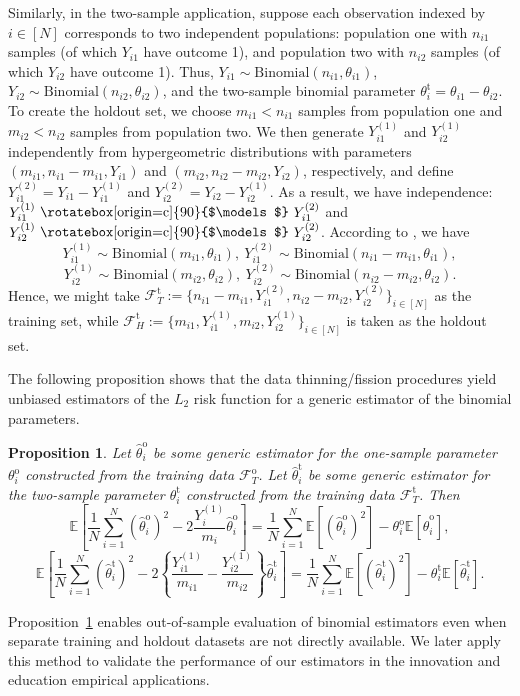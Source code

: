 \documentclass[12pt,letterpaper]{article}
\newcommand{\indep}{\ \raisebox{0.05em}{\rotatebox[origin=c]{90}{$\models$}} \ }
\newtheorem{proposition}{Proposition}[section]
\begin{document}
Similarly, in the two-sample application, suppose each observation indexed by $i\in[N]$ corresponds to two independent populations: population one with $n_{i1}$ samples (of which $Y_{i1}$ have outcome 1), and population two with $n_{i2}$ samples (of which $Y_{i2}$ have outcome 1). Thus, $Y_{i1}\sim\textrm{Binomial}(n_{i1},\theta_{i1})$, $Y_{i2}\sim\textrm{Binomial}(n_{i2},\theta_{i2})$, and the two-sample binomial parameter $\theta_i^{\mathrm{t}}=\theta_{i1}-\theta_{i2}$. To create the holdout set, we choose $m_{i1}<n_{i1}$ samples from population one and $m_{i2}<n_{i2}$ samples from population two. We then generate $Y_{i1}^{(1)}$ and $Y_{i2}^{(1)}$ independently from hypergeometric distributions with parameters $(m_{i1},n_{i1}-m_{i1},Y_{i1})$ and $(m_{i2},n_{i2}-m_{i2},Y_{i2})$, respectively, and define $Y_{i1}^{(2)}=Y_{i1}-Y_{i1}^{(1)}$ and $Y_{i2}^{(2)}=Y_{i2}-Y_{i2}^{(1)}$. As a result, we have independence: $Y_{i1}^{(1)}\indep Y_{i1}^{(2)}$ and $Y_{i2}^{(1)}\indep Y_{i2}^{(2)}$. According to \citet{neufeld2024data,leiner2025data}, we have
$$Y_{i1}^{(1)}\sim\mathrm{Binomial}(m_{i1},\theta_{i1}),\ Y_{i1}^{(2)}\sim\mathrm{Binomial}(n_{i1}-m_{i1},\theta_{i1}),$$   
$$Y_{i2}^{(1)}\sim\mathrm{Binomial}(m_{i2},\theta_{i2}),\ Y_{i2}^{(2)}\sim\mathrm{Binomial}(n_{i2}-m_{i2},\theta_{i2}).$$
Hence, we might take $\mathcal{F}_T^{\mathrm{t}}:=\{n_{i1}-m_{i1},Y_{i1}^{(2)},n_{i2}-m_{i2},Y_{i2}^{(2)}\}_{i\in[N]}$ as the training set, while $\mathcal{F}_H^{\mathrm{t}}:=\{m_{i1},Y_{i1}^{(1)},m_{i2},Y_{i2}^{(1)}\}_{i\in[N]}$ is taken as the holdout set. 

The following proposition shows that the data thinning/fission procedures yield unbiased estimators of the $L_2$ risk function for a generic estimator of the binomial parameters.
\begin{proposition}\label{prop:data:split}
Let $\hat{\theta}_i^{\mathrm{o}}$ be some generic estimator for the one-sample parameter $\theta_i^{\mathrm{o}}$ constructed from the training data $\mathcal{F}_T^{\mathrm{o}}$. Let $\hat{\theta}_i^{\mathrm{t}}$ be some generic estimator for the two-sample parameter $\theta_i^{\mathrm{t}}$ constructed from the training data $\mathcal{F}_T^{\mathrm{t}}$. Then 
$$\mathbb{E}\left[\frac{1}{N}\sum_{i=1}^N\left(\hat{\theta}_i^{\mathrm{o}}\right)^2-2\frac{Y_i^{(1)}}{m_i}\hat{\theta}_i^{\mathrm{o}}\right]=\frac{1}{N}\sum_{i=1}^N\mathbb{E}\left[\left(\hat{\theta}_i^{\mathrm{o}}\right)^2\right]-\theta_i^{\mathrm{o}}\mathbb{E}\left[\hat{\theta}_i^{\mathrm{o}}\right],$$
$$\mathbb{E}\left[\frac{1}{N}\sum_{i=1}^N\left(\hat{\theta}_i^{\mathrm{t}}\right)^2-2\left\{\frac{Y_{i1}^{(1)}}{m_{i1}}-\frac{Y_{i2}^{(1)}}{m_{i2}}\right\}\hat{\theta}_i^{\mathrm{t}}\right]=\frac{1}{N}\sum_{i=1}^N\mathbb{E}\left[\left(\hat{\theta}_i^{\mathrm{t}}\right)^2\right]-\theta_i^{\mathrm{t}}\mathbb{E}\left[\hat{\theta}_i^{\mathrm{t}}\right].$$
\end{proposition}
Proposition~\ref{prop:data:split} enables out-of-sample evaluation of binomial estimators even when separate training and holdout datasets are not directly available. We later apply this method to validate the performance of our estimators in the innovation and education empirical applications.
\end{document}
